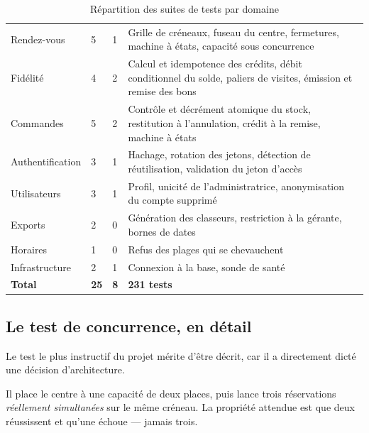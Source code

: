 \begin{table}[H]
\centering
\caption{Répartition des suites de tests par domaine}
\label{tab:suites-tests}
\begin{tabularx}{\textwidth}{L{3.0cm} C{1.3cm} C{1.9cm} X}
\toprule
{} &  &  &  \\
\midrule
Rendez-vous & 5 & 1 &
Grille de créneaux, fuseau du centre, fermetures, machine à états, capacité
sous concurrence \\

Fidélité & 4 & 2 &
Calcul et idempotence des crédits, débit conditionnel du solde, paliers de
visites, émission et remise des bons \\

Commandes & 5 & 2 &
Contrôle et décrément atomique du stock, restitution à l'annulation, crédit à
la remise, machine à états \\

Authentification & 3 & 1 &
Hachage, rotation des jetons, détection de réutilisation, validation du jeton
d'accès \\

Utilisateurs & 3 & 1 &
Profil, unicité de l'administratrice, anonymisation du compte supprimé \\

Exports & 2 & 0 &
Génération des classeurs, restriction à la gérante, bornes de dates \\

Horaires & 1 & 0 & Refus des plages qui se chevauchent \\
Infrastructure & 2 & 1 & Connexion à la base, sonde de santé \\
\midrule
\textbf{Total} & \textbf{25} & \textbf{8} & \textbf{231 tests} \\
\bottomrule
\end{tabularx}
\end{table}

\subsection{Le test de concurrence, en détail}

Le test le plus instructif du projet mérite d'être décrit, car il a
directement dicté une décision d'architecture.

Il place le centre à une capacité de deux places, puis lance trois réservations
\emph{réellement simultanées} sur le même créneau. La propriété attendue est
que deux réussissent et qu'une échoue --- jamais trois.

